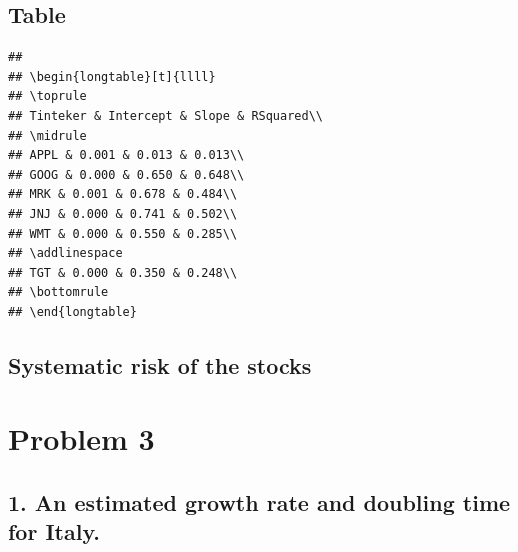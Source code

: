 \documentclass[
]{article}
\begin{document}
\hypertarget{table}{%
\subsection{Table}\label{table}}

\begin{verbatim}
## 
## \begin{longtable}[t]{llll}
## \toprule
## Tinteker & Intercept & Slope & RSquared\\
## \midrule
## APPL & 0.001 & 0.013 & 0.013\\
## GOOG & 0.000 & 0.650 & 0.648\\
## MRK & 0.001 & 0.678 & 0.484\\
## JNJ & 0.000 & 0.741 & 0.502\\
## WMT & 0.000 & 0.550 & 0.285\\
## \addlinespace
## TGT & 0.000 & 0.350 & 0.248\\
## \bottomrule
## \end{longtable}
\end{verbatim}

\hypertarget{systematic-risk-of-the-stocks}{%
\subsection{Systematic risk of the
stocks}\label{systematic-risk-of-the-stocks}}

\hypertarget{problem-3}{%
\section{Problem 3}\label{problem-3}}

\hypertarget{an-estimated-growth-rate-and-doubling-time-for-italy.}{%
\subsection{1. An estimated growth rate and doubling time for
Italy.}\label{an-estimated-growth-rate-and-doubling-time-for-italy.}}
\end{document}
